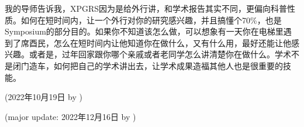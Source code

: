 我的导师告诉我，XPGRS因为是给外行讲，和学术报告其实不同，更偏向科普性质。如何在短时间内，让一个外行对你的研究感兴趣，并且搞懂个70\%，也是Symposium的部分目的。如果你不知道该怎么做，可以想象有一天你在电梯里遇到了席酉民，怎么在短时间内让他知道你在做什么，又有什么用，最好还能让他感兴趣。或者是，过年回家跟你哪个亲戚或者老同学怎么讲清楚你在做什么。学术不是闭门造车，如何把自己的学术讲出去，让学术成果造福其他人也是很重要的技能。

\begin{flushright}
(2022年10月19日 by \Wu)

(major update: 2022年12月16日 by \Wu)
\end{flushright}